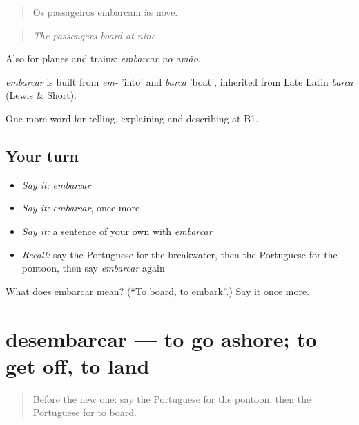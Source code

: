\begin{quote}
Os passageiros embarcam às nove.
\end{quote}

\begin{quote}
\emph{The passengers board at nine.}
\end{quote}

Also for planes and trains: \emph{embarcar no avião}.

\begin{cousinweb}
\emph{embarcar} is built from \emph{em-} 'into' and \emph{barca} 'boat', inherited from Late Latin \emph{barca} (Lewis \& Short).
\end{cousinweb}

\begin{grammarlens}[title={What you've built}]
One more word for telling, explaining and describing at B1.
\end{grammarlens}

\subsection*{Your turn}
\begin{itemize}
\raggedright
  \item \emph{Say it:} \emph{embarcar}
  \item \emph{Say it:} \emph{embarcar}, once more
  \item \emph{Say it:} a sentence of your own with \emph{embarcar}
  \item \emph{Recall:} say the Portuguese for the breakwater, then the Portuguese for the pontoon, then say \emph{embarcar} again
\end{itemize}

\begin{tcolorbox}[breakable,colback=teal!4,colframe=teal!35!black,title={Before you move on}]
What does embarcar mean? (\textquotedblleft{}To board, to embark\textquotedblright{}.) Say it once more.
\end{tcolorbox}
\section[desembarcar]{desembarcar — to go ashore; to get off, to land}

\label{lesson:PT-C417-desembarcar}



\begin{quote}
Before the new one: say the Portuguese for the pontoon, then the Portuguese for to board.
\end{quote}

